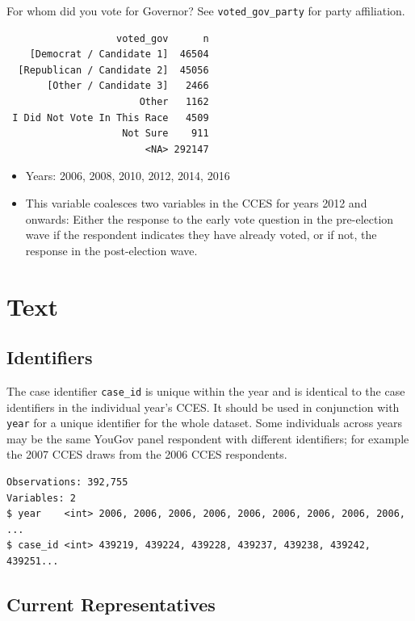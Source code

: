 \documentclass[10pt,article,oneside]{memoir}
\theoremstyle{definition}
\begin{document}
For whom did you vote for Governor? See \texttt{voted\_gov\_party} for
party affiliation.

\begin{verbatim}
                   voted_gov      n
    [Democrat / Candidate 1]  46504
  [Republican / Candidate 2]  45056
       [Other / Candidate 3]   2466
                       Other   1162
 I Did Not Vote In This Race   4509
                    Not Sure    911
                        <NA> 292147
\end{verbatim}

\begin{itemize}
\tightlist
\item
  Years: 2006, 2008, 2010, 2012, 2014, 2016
\item
  This variable coalesces two variables in the CCES for years 2012 and
  onwards: Either the response to the early vote question in the
  pre-election wave if the respondent indicates they have already voted,
  or if not, the response in the post-election wave.
\end{itemize}

\newpage

\hypertarget{text}{%
\section{Text}\label{text}}

\hypertarget{identifiers}{%
\subsection{Identifiers}\label{identifiers}}

The case identifier \texttt{case\_id} is unique within the year and is
identical to the case identifiers in the individual year's CCES. It
should be used in conjunction with \texttt{year} for a unique identifier
for the whole dataset. Some individuals across years may be the same
YouGov panel respondent with different identifiers; for example the 2007
CCES draws from the 2006 CCES respondents.

\begin{verbatim}
Observations: 392,755
Variables: 2
$ year    <int> 2006, 2006, 2006, 2006, 2006, 2006, 2006, 2006, 2006, ...
$ case_id <int> 439219, 439224, 439228, 439237, 439238, 439242, 439251...
\end{verbatim}

\hypertarget{current-representatives}{%
\subsection{Current Representatives}\label{current-representatives}}
\end{document}

